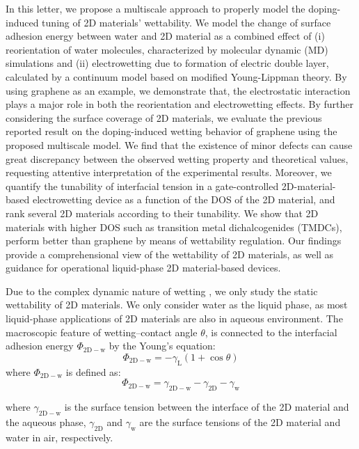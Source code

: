 \documentclass[journal=ancac3,manuscript=article,email=true]{achemso}
\begin{document}
In this letter, we propose a multiscale approach to properly model the
doping-induced tuning of 2D materials' wettability. We model the
change of surface adhesion energy between water and 2D material as a
combined effect of (i) reorientation of water molecules, characterized
by molecular dynamic (MD) simulations and (ii) electrowetting due to
formation of electric double layer, calculated by a continuum model
based on modified Young-Lippman theory. By using graphene as an
example, we demonstrate that, the electrostatic interaction plays a
major role in both the reorientation and electrowetting effects. By
further considering the surface coverage of 2D materials, we evaluate
the previous reported result on the doping-induced wetting behavior of
graphene using the proposed multiscale model. We find that the
existence of minor defects can cause great discrepancy between the
observed wetting property and theoretical values, requesting attentive
interpretation of the experimental results. Moreover, we quantify the
tunability of interfacial tension in a gate-controlled
2D-material-based electrowetting device as a function of the DOS of
the 2D material, and rank several 2D materials according to their
tunability. We show that 2D materials with higher DOS such as
transition metal dichalcogenides (TMDCs), perform better than graphene
by means of wettability regulation. Our findings provide a
comprehensional view of the wettability of 2D materials, as well as
guidance for operational liquid-phase 2D material-based devices.



Due to the complex dynamic nature of wetting
\cite{Cassie_1944,Wenzel_1936,Gao_2007,Marmur_2009}, we only study the
static wettability of 2D materials. We only consider water as the
liquid phase, as most liquid-phase applications of 2D materials are
also in aqueous environment. The macroscopic feature of
wetting--contact angle \(\theta\), is connected to the interfacial
adhesion energy \(\Phi_{\mathrm{2D-w}}\) by the Young's equation:
\begin{equation}
\label{eqn:young's equation}
\Phi_{\mathrm{2D-w}} = -\gamma_{\mathrm{L}}(1+\cos\theta)
\end{equation}
where \(\Phi_{\mathrm{2D-w}}\) is defined as:
\begin{equation}
\label{eqn:def-adhesion}
\Phi_{\mathrm{2D-w}} = \gamma_{\mathrm{2D-w}} - \gamma_{\mathrm{2D}} - \gamma_{\mathrm{w}}
\end{equation}

where \(\gamma_{\mathrm{2D-w}}\) is the surface tension between the
interface of the 2D material and the aqueous phase,
\(\gamma_{\mathrm{2D}}\) and \(\gamma_{\mathrm{w}}\) are the surface
tensions of the 2D material and water in air,
respectively.
\end{document}
